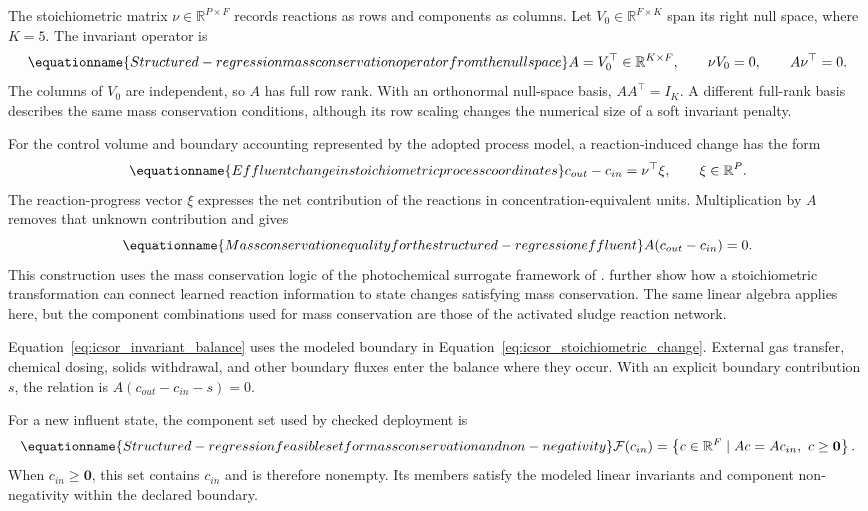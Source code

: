 The stoichiometric matrix \(\nu\in\mathbb{R}^{P\times F}\) records reactions as rows and components as columns. Let \(V_0\in\mathbb{R}^{F\times K}\) span its right null space, where \(K=5\). The invariant operator is
\begin{equation}
\equationname{Structured-regression mass conservation operator from the null space}
\label{eq:icsor_invariant_operator}
A=V_0^\top\in\mathbb{R}^{K\times F},
\qquad \nu V_0=0,
\qquad A\nu^\top=0.
\end{equation}
The columns of \(V_0\) are independent, so \(A\) has full row rank. With an orthonormal null-space basis, \(AA^\top=I_K\). A different full-rank basis describes the same mass conservation conditions, although its row scaling changes the numerical size of a soft invariant penalty.

For the control volume and boundary accounting represented by the adopted process model, a reaction-induced change has the form
\begin{equation}
\equationname{Effluent change in stoichiometric process coordinates}
\label{eq:icsor_stoichiometric_change}
c_{out}-c_{in}=\nu^\top\xi,
\qquad \xi\in\mathbb{R}^{P}.
\end{equation}
The reaction-progress vector \(\xi\) expresses the net contribution of the reactions in concentration-equivalent units. Multiplication by \(A\) removes that unknown contribution and gives
\begin{equation}
\equationname{Mass conservation equality for the structured-regression effluent}
\label{eq:icsor_invariant_balance}
A(c_{out}-c_{in})=0.
\end{equation}
This construction uses the mass conservation logic of the photochemical surrogate framework of \citet{SturmWexler2020}. \citet{SturmWexler2022} further show how a stoichiometric transformation can connect learned reaction information to state changes satisfying mass conservation. The same linear algebra applies here, but the component combinations used for mass conservation are those of the activated sludge reaction network.

Equation~\eqref{eq:icsor_invariant_balance} uses the modeled boundary in Equation~\eqref{eq:icsor_stoichiometric_change}. External gas transfer, chemical dosing, solids withdrawal, and other boundary fluxes enter the balance where they occur. With an explicit boundary contribution \(s\), the relation is \(A(c_{out}-c_{in}-s)=0\).

For a new influent state, the component set used by checked deployment is
\begin{equation}
\equationname{Structured-regression feasible set for mass conservation and non-negativity}
\label{eq:icsor_feasible_set}
\mathcal{F}(c_{in})=
\left\{c\in\mathbb{R}^{F}\mid Ac=Ac_{in},\ c\geq\mathbf{0}\right\}.
\end{equation}
When \(c_{in}\geq\mathbf{0}\), this set contains \(c_{in}\) and is therefore nonempty. Its members satisfy the modeled linear invariants and component non-negativity within the declared boundary.

